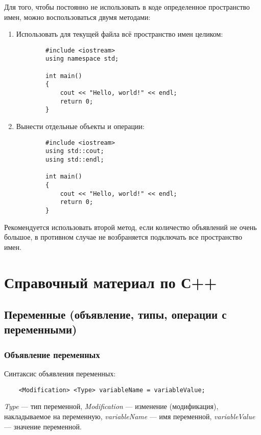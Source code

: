 Для того, чтобы постоянно не использовать в коде определенное пространство имен, можно воспользоваться двумя методами:
\begin{enumerate}
    \item Использовать для текущей файла всё пространство имен целиком:
    \begin{lstlisting}
        #include <iostream>
        using namespace std;
        
        int main()
        {
            cout << "Hello, world!" << endl;
            return 0;
        }
    \end{lstlisting}
    
    \item Вынести отдельные объекты и операции:
    \begin{lstlisting}
        #include <iostream>
        using std::cout;
        using std::endl;

        int main()
        {
            cout << "Hello, world!" << endl;
            return 0;
        }
    \end{lstlisting}
\end{enumerate} 

Рекомендуется использовать второй метод, если количество объявлений не очень большое, в противном случае не возбраняется подключать все пространство имен.


\section{Справочный материал по С++}

\subsection{Переменные (объявление, типы, операции с переменными)}

\subsubsection{Объявление переменных}
Синтаксис объявления переменных:

\begin{lstlisting}
    <Modification> <Type> variableName = variableValue;
\end{lstlisting}

\textit{Type} --- тип переменной, \textit{Modification} --- изменение (модификация), накладываемое на переменную, \textit{variableName} --- имя переменной, \textit{variableValue} --- значение переменной.


